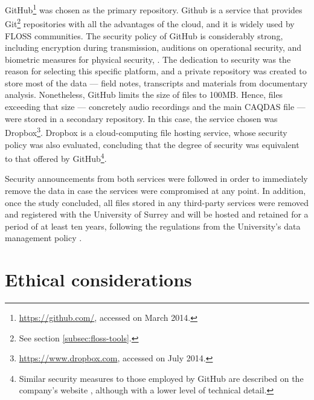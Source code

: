GitHub\footnote{\url{https://github.com/}, accessed on  March 2014.} was chosen as the primary repository. Github is a service that provides Git\footnote{See section \ref{subsec:floss-tools}.} repositories with all the advantages of the cloud, and it is widely used by FLOSS communities. The security policy of GitHub is considerably strong, including encryption during transmission, auditions on operational security, and biometric measures for physical security, \parencite{github-security2014}. The dedication to security was the reason for selecting this specific platform, and a private repository was created to store most of the data --- field notes, transcripts and materials from documentary analysis. Nonetheless, GitHub limits the size of files to 100MB. Hence, files exceeding that size --- concretely audio recordings and the main CAQDAS file ---  were stored in a secondary repository. In this case, the service chosen was Dropbox\footnote{\url{https://www.dropbox.com}, accessed on  July 2014.}. Dropbox is a cloud-computing file hosting service, whose security policy was also evaluated, concluding that the degree of security was equivalent to that offered by GitHub\footnote{Similar security measures to those employed by GitHub are described on the company's website \parencite{dropbox-security2014}, although with a lower level of technical detail.}.

Security announcements from both services were followed in order to immediately remove the data in case the services were compromised at any point. In addition, once the study concluded, all files stored in any third-party services were removed and registered with the University of Surrey and will be hosted and retained for a period of at least ten years, following the regulations from the University's data management policy \parencite{uniS-data-management:2017:Online}.

\section{Ethical considerations}
\label{par:ethical-gen}

